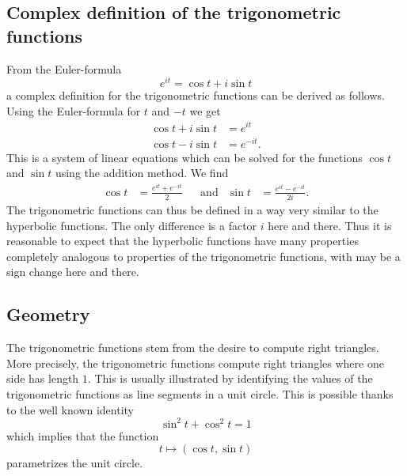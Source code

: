\subsection{Complex definition of the trigonometric functions}
From the Euler-formula
\[
e^{it}=\cos t+i\sin t
\]
a complex definition for the trigonometric functions can be derived
as follows.
Using the Euler-formula for $t$ and $-t$ we get
\begin{align*}
\cos t+i\sin t&=e^{it}\\
\cos t-i\sin t&=e^{-it}.
\end{align*}
This is a system of linear equations which can be solved
for the functions $\cos t$ and $\sin t$ using the addition method.
We find
\begin{align*}
\cos t
&=
\frac{e^{it}+e^{-it}}2
&&\text{and}
&
\sin t
&=
\frac{e^{it}-e^{-it}}{2i}.
\end{align*}
The trigonometric functions can thus be defined in a way very similar
to the hyperbolic functions.
The only difference is a factor $i$ here and there.
Thus it is reasonable to expect that the hyperbolic functions
have many properties completely analogous to properties of the
trigonometric functions, with may be a sign change here and there.

\subsection{Geometry}
The trigonometric functions stem from the desire to compute right
triangles.
More precisely, the trigonometric functions compute right triangles
where one side has length $1$.
This is usually illustrated by identifying the values of the
trigonometric functions as line segments in a unit circle.
This is possible thanks to the well known identity
\[
\sin^2t+\cos^2t=1
\]
which implies that the function
\[
t\mapsto (\cos t,\sin t)
\]
parametrizes the unit circle.

